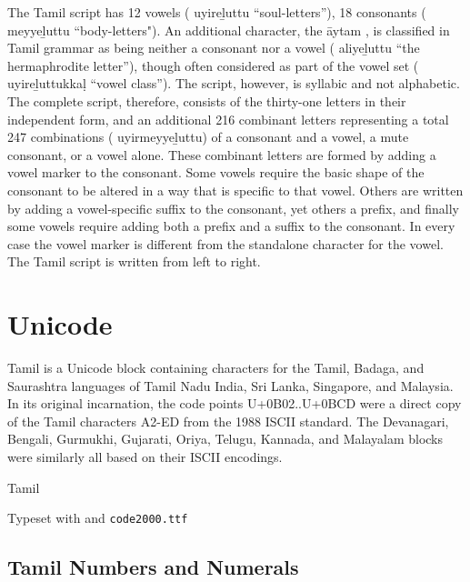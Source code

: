 The Tamil script has 12 vowels ( uyireḻuttu ``soul-letters''), 18 consonants ( meyyeḻuttu ``body-letters").
An additional character, the āytam ,  is classified in Tamil grammar as being neither a consonant nor a vowel ( aliyeḻuttu ``the hermaphrodite letter''), though often considered as part of the vowel set ( uyireḻuttukkaḷ ``vowel class''). The script, however, is syllabic and not alphabetic. The complete script, therefore, consists of the thirty-one letters in their independent form, and an additional 216 combinant letters representing a total 247 combinations ( uyirmeyyeḻuttu) of a consonant and a vowel, a mute consonant, or a vowel alone. These combinant letters are formed by adding a vowel marker to the consonant. Some vowels require the basic shape of the consonant to be altered in a way that is specific to that vowel. Others are written by adding a vowel-specific suffix to the consonant, yet others a prefix, and finally some vowels require adding both a prefix and a suffix to the consonant. In every case the vowel marker is different from the standalone character for the vowel.
The Tamil script is written from left to right.


\section{Unicode}

Tamil is a Unicode block containing characters for the Tamil, Badaga, and Saurashtra languages of Tamil Nadu India, Sri Lanka, Singapore, and Malaysia. In its original incarnation, the code points U+0B02..U+0BCD were a direct copy of the Tamil characters A2-ED from the 1988 ISCII standard. The Devanagari, Bengali, Gurmukhi, Gujarati, Oriya, Telugu, Kannada, and Malayalam blocks were similarly all based on their ISCII encodings.

\begin{scriptexample}[]{Tamil}

\hfill  Typeset with \cmd{\tamil} and \texttt{code2000.ttf}
\end{scriptexample}

\subsection{Tamil Numbers and Numerals}

